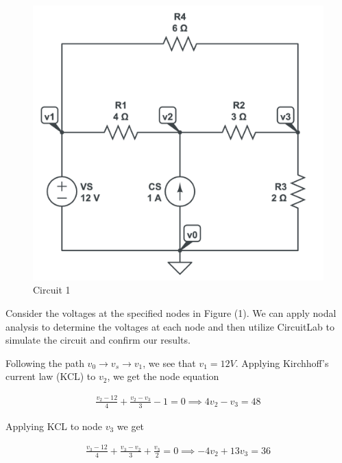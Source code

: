 \documentclass[12pt]{article}
\begin{document}
\begin{figure}[H]
    \begin{center}
        \includegraphics[scale=0.5]{circuit-1.png}
        \caption { Circuit 1}
    \end{center}
\end{figure}

Consider the voltages at the specified nodes in Figure (1). We can apply nodal analysis to determine the voltages at each node and then utilize CircuitLab to simulate the circuit and confirm our results.

Following the path $ v_0 \rightarrow v_s \rightarrow v_1$, we see that $v_1 = 12V$. Applying Kirchhoff's current law (KCL) to $v_2$, we get the node equation

\begin{equation}
    \begin{split}
        \frac{v_2 - 12}{4} + \frac{v_2 - v_3}{3} - 1 = 0 \implies 4v_2 - v_3 = 48
    \end{split}
\end{equation}

Applying KCL to node $v_3$ we get

\begin{equation}
    \begin{split}
        \frac{v_3 - 12}{4} + \frac{v_3 - v_2}{3} + \frac{v_3}{2} = 0 \implies -4v_2 + 13v_3 = 36
    \end{split}
\end{equation}
\end{document}
